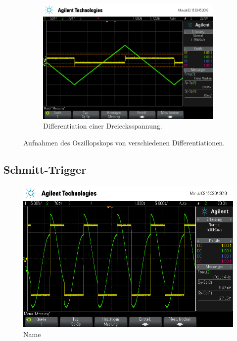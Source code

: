 \begin{figure}[ht]
\begin{subfigure}[]{\textwidth}
    \label{subfig:dif_rechteck}
  \end{subfigure}
  \begin{subfigure}[]{\textwidth}
    \centering
    \includegraphics[height=0.3\textheight]{data/scope_267.png}
    \caption{Differentiation einer Dreiecksspannung.}
    \label{subfig:dif_dreieck}
  \end{subfigure}
  \caption{Aufnahmen des Oszillopskops von verschiedenen Differentiationen.}
  \label{fig:integrationen}
\end{figure}

\subsection{Schmitt-Trigger}
\begin{figure}[ht]
  \centering
  \includegraphics[height=0.3\textheight]{data/scope_268.png}
  \caption{Name}
  \label{fig:name}
\end{figure}

